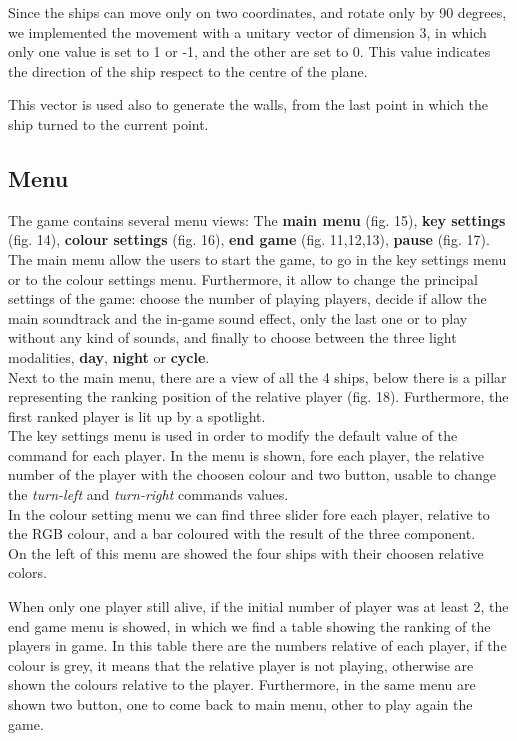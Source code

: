 \documentclass[11pt]{article}
\begin{document}
Since the ships can move only on two coordinates, and rotate  only by 90 degrees, we implemented the movement with a unitary vector of dimension 3, in which only one value is set to 1 or -1, and the other are set to 0. This value indicates the direction of the ship respect to the centre of the plane. 

This vector is used also to generate the walls, from the last point in which the ship turned to the current point.
\subsection{Menu}
	The game contains several menu views: The \textbf{main menu} (fig. 15), \textbf{key settings} (fig. 14), \textbf{colour settings} (fig. 16), \textbf{end game} (fig. 11,12,13), \textbf{pause} (fig. 17).\\
	
	The main menu allow the users to start the game, to go in the key settings menu or to the colour settings menu.
	Furthermore, it allow to change the principal settings of the game: choose the number of playing players, decide if allow the main soundtrack and the in-game sound effect, only the last one or to play without any kind of sounds, and finally to choose between the three light modalities, \textbf{day}, \textbf{night} or \textbf{cycle}.\\
	Next to the main menu, there are a view of all the 4 ships, below there is a pillar representing the ranking position of the relative player (fig. 18).
	Furthermore, the first ranked player is lit up by a spotlight.\\
	
	The key settings menu is used in order to modify the default value of the command for each player. In the menu is shown, fore each player, the relative number of the player with the choosen colour and two button, usable to change the \textit{turn-left} and \textit{turn-right} commands values.\\
	
	In the colour setting menu we can find three slider fore each player, relative to the RGB colour, and a bar coloured with the result of the three component.\\
	On the left of this menu are showed the four ships with their choosen relative colors.
	
	When only one player still alive, if the initial number of player was at least 2, the end game menu is showed, in which we find a table showing the ranking of the players in game. In this table there are the numbers relative of each player, if the colour is grey, it means that the relative player is not playing, otherwise are shown the colours relative to the player.
	Furthermore, in the same menu are shown two button, one to come back to main menu, other to play again the game.\\
	
\end{document}
